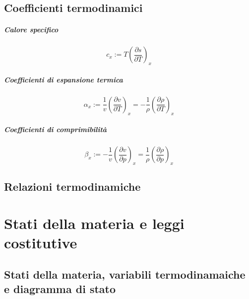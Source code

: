 \section{Coefficienti termodinamici}
\paragraph{Calore specifico}
\begin{equation}
   c_x := T \left(\dfrac{\partial s}{\partial T} \right)_x
\end{equation}
\paragraph{Coefficienti di espansione termica}
\begin{equation}
    \alpha_x := \dfrac{1}{v} \left(\dfrac{\partial v}{\partial T} \right)_x = - \dfrac{1}{\rho} \left(\dfrac{\partial \rho}{\partial T} \right)_x
\end{equation}
\paragraph{Coefficienti di comprimibilità}
\begin{equation}
    \beta_x := -\dfrac{1}{v} \left(\dfrac{\partial v}{\partial p} \right)_x = \dfrac{1}{\rho} \left(\dfrac{\partial \rho}{\partial p} \right)_x
\end{equation}

\section{Relazioni termodinamiche}

\chapter{Stati della materia e leggi costitutive}
\section{Stati della materia, variabili termodinamaiche e diagramma di stato}
